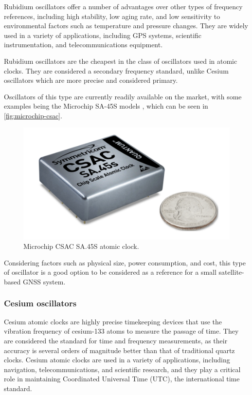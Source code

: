 Rubidium oscillators offer a number of advantages over other types of frequency references, including high stability, low aging rate, and low sensitivity to environmental factors such as temperature and pressure changes. They are widely used in a variety of applications, including GPS systems, scientific instrumentation, and telecommunications equipment.

Rubidium oscillators are the cheapest in the class of oscillators used in atomic clocks. They are considered a secondary frequency standard, unlike Cesium oscillators which are more precise and considered primary.

Oscillators of this type are currently readily available on the market, with some examples being the Microchip SA-45S models \cite{sa45s}, which can be seen in \autoref{fig:microchip-csac}.

\begin{figure}[!ht]
    \begin{center}
        \includegraphics[width=0.7\columnwidth]{figures/microchip-csac}
        \caption{Microchip CSAC SA.45S atomic clock.}
        \label{fig:microchip-csac}
    \end{center}
\end{figure}

Considering factors such as physical size, power consumption, and cost, this type of oscillator is a good option to be considered as a reference for a small satellite-based GNSS system.

\subsubsection{Cesium oscillators}

Cesium atomic clocks are highly precise timekeeping devices that use the vibration frequency of cesium-133 atoms to measure the passage of time. They are considered the standard for time and frequency measurements, as their accuracy is several orders of magnitude better than that of traditional quartz clocks. Cesium atomic clocks are used in a variety of applications, including navigation, telecommunications, and scientific research, and they play a critical role in maintaining Coordinated Universal Time (UTC), the international time standard.

